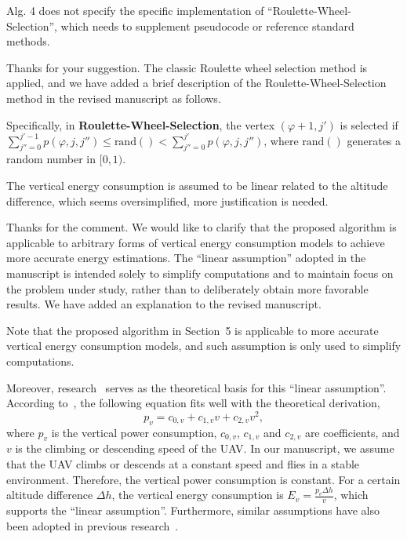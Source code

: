 \begin{revcomment}
	Alg. 4 does not specify the specific implementation of ``Roulette-Wheel-Selection'', which needs to supplement pseudocode or reference standard methods.
\end{revcomment}
\begin{revresponse}
	Thanks for your suggestion.
	The classic Roulette wheel selection method is applied, and we have added a brief description of the Roulette-Wheel-Selection method in the revised manuscript as follows.
	\begin{changes}
		Specifically, in \textbf{Roulette-Wheel-Selection}, the vertex $(\varphi+1, j')$ is selected if $\sum_{j''=0}^{j'-1}{p(\varphi,j,j'')}\leq \text{rand}() < \sum_{j''=0}^{j'}{p(\varphi,j,j'')}$, where $\text{rand}()$ generates a random number in $[0,1)$.
	\end{changes}
\end{revresponse}

\begin{revcomment}
	The vertical energy consumption is assumed to be linear related to the altitude difference, which seems oversimplified, more justification is needed.
\end{revcomment}
\begin{revresponse}
	Thanks for the comment.
	We would like to clarify that the proposed algorithm is applicable to arbitrary forms of vertical energy consumption models to achieve more accurate energy estimations.
	The ``linear assumption'' adopted in the manuscript is intended solely to simplify computations and to maintain focus on the problem under study, rather than to deliberately obtain more favorable results.
	We have added an explanation to the revised manuscript.

	\begin{changes}
		Note that the proposed algorithm in Section~5 is applicable to more accurate vertical energy consumption models, and such assumption is only used to simplify computations.
	\end{changes}

	Moreover, research~\cite{vertical-assumption} serves as the theoretical basis for this ``linear assumption''.
	According to~\cite{vertical-assumption}, the following equation fits well with the theoretical derivation,
	\begin{equation}
		p_v = c_{0,v} + c_{1,v}v + c_{2,v}v^2,
	\end{equation}
	where $p_v$ is the vertical power consumption, $c_{0,v}$, $c_{1,v}$ and $c_{2,v}$ are coefficients, and $v$ is the climbing or descending speed of the UAV.
	In our manuscript, we assume that the UAV climbs or descends at a constant speed and flies in a stable environment.
	Therefore, the vertical power consumption is constant.
	For a certain altitude difference $\Delta h$, the vertical energy consumption is $E_v=\frac{p_v\Delta h}{v}$, which supports the ``linear assumption''.
	Furthermore, similar assumptions have also been adopted in previous research~\cite{mgh}.
\end{revresponse}

